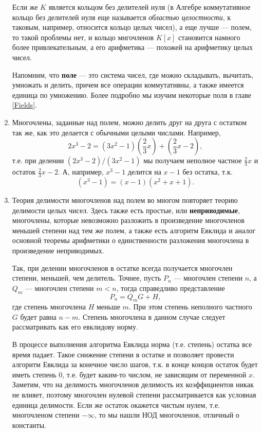 \begin{enumerate}
Если же $K$ является кольцом без делителей нуля (в Алгебре коммутативное кольцо без делителей нуля еще называется \textit{областью целостности}, к таковым, например, относится кольцо целых чисел), а еще лучше --- полем, то такой проблемы нет, и кольцо мнгочленов $K[x]$ становится намного более привлекательным, а его арифметика --- похожей на арифметику целых чисел.

Напомним, что \textbf{поле} --- это система чисел, где можно складывать, вычитать, умножать и делить, причем все операции коммутативны, а также имеется единица по умножению. Более подробно мы изучим некоторые поля в главе \ref{Fields}.

\item Многочлены, заданные над полем, можно делить друг на друга с остатком так же, как это делается с обычными целыми числами. Например, 
$$
2x^3-2=(3x^2-1)\left(\frac23x\right) + \left(\frac23x-2\right),
$$
т.е. при делении $(2x^3-2)/(3x^2-1)$ мы получаем неполное частное $\frac23x$ и остаток $\frac23x-2$. А, например, $x^3-1$ делится на $x-1$ без остатка, т.к.
$$
(x^3-1)=(x-1)(x^2+x+1).
$$
\item Теория делимости многочленов над полем во многом повторяет теорию делимости целых чисел. Здесь также есть простые, или \textbf{неприводимые}, многочлены, которые невозможно разложить в произведение многочленов меньшей степени над тем же полем, а также есть алгоритм Евклида и аналог основной теоремы арифметики о единственности разложения многочлена в произведение неприводимых.

Так, при делении многочленов в остатке всегда получается многочлен степени, меньшей, чем делитель. Точнее, пусть $P_n$ --- многочлен степени $n$, а $Q_m$ --- многочлен степени $m<n$, тогда справедливо представление
$$
P_n = Q_m G+H,
$$
где степень многочлена $H$ меньше $m$. При этом степень неполного частного $G$ будет равна $n-m$. Степень многочлена в данном случае следует рассматривать как его евклидову норму.

В процессе выполнения алгоритма Евклида норма (т.е. степень) остатка все время падает.
Такое снижение степени в остатке и позволяет провести алгоритм Евклида за конечное число шагов, т.к. в конце концов остаток будет иметь степень 0, т.е. будет каким-то числом, не зависящим от переменной $x$. Заметим, что на делимость многочленов делимость их коэффициентов никак не влияет, поэтому многочлен нулевой степени рассматривается как условная единица делимости.
 Если же остаток окажется чистым нулем, т.е. многочленом степени $-\infty$, то мы нашли НОД многочленов, отличный о константы.
 

\end{enumerate}

